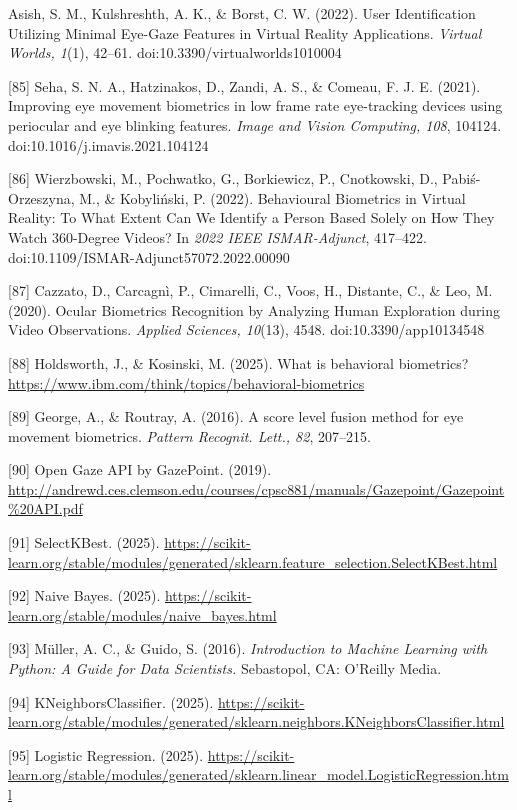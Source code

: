 \documentclass[12pt]{report}
\begin{document}
\begin{raggedright}
[84] Asish, S. M., Kulshreshth, A. K., \& Borst, C. W. (2022). User Identification Utilizing Minimal Eye-Gaze Features in Virtual Reality Applications. \textit{Virtual Worlds, 1}(1), 42–61. doi:10.3390/virtualworlds1010004

[85] Seha, S. N. A., Hatzinakos, D., Zandi, A. S., \& Comeau, F. J. E. (2021). Improving eye movement biometrics in low frame rate eye-tracking devices using periocular and eye blinking features. \textit{Image and Vision Computing, 108}, 104124. doi:10.1016/j.imavis.2021.104124

[86] Wierzbowski, M., Pochwatko, G., Borkiewicz, P., Cnotkowski, D., Pabiś-Orzeszyna, M., \& Kobyliński, P. (2022). Behavioural Biometrics in Virtual Reality: To What Extent Can We Identify a Person Based Solely on How They Watch 360-Degree Videos? In \textit{2022 IEEE ISMAR-Adjunct}, 417–422. doi:10.1109/ISMAR-Adjunct57072.2022.00090

[87] Cazzato, D., Carcagnì, P., Cimarelli, C., Voos, H., Distante, C., \& Leo, M. (2020). Ocular Biometrics Recognition by Analyzing Human Exploration during Video Observations. \textit{Applied Sciences, 10}(13), 4548. doi:10.3390/app10134548

[88] Holdsworth, J., \& Kosinski, M. (2025). What is behavioral biometrics? \url{https://www.ibm.com/think/topics/behavioral-biometrics}

[89] George, A., \& Routray, A. (2016). A score level fusion method for eye movement biometrics. \textit{Pattern Recognit. Lett., 82}, 207–215.

[90] Open Gaze API by GazePoint. (2019). \url{http://andrewd.ces.clemson.edu/courses/cpsc881/manuals/Gazepoint/Gazepoint%20API.pdf}

[91] SelectKBest. (2025). \url{https://scikit-learn.org/stable/modules/generated/sklearn.feature_selection.SelectKBest.html}

[92] Naive Bayes. (2025). \url{https://scikit-learn.org/stable/modules/naive_bayes.html}

[93] Müller, A. C., \& Guido, S. (2016). \textit{Introduction to Machine Learning with Python: A Guide for Data Scientists.} Sebastopol, CA: O'Reilly Media.

[94] KNeighborsClassifier. (2025). \url{https://scikit-learn.org/stable/modules/generated/sklearn.neighbors.KNeighborsClassifier.html}

[95] Logistic Regression. (2025). \url{https://scikit-learn.org/stable/modules/generated/sklearn.linear_model.LogisticRegression.html}


\end{raggedright}
\end{document}
